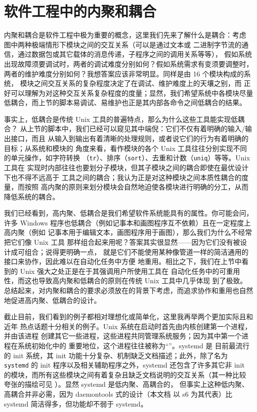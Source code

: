 \section{软件工程中的内聚和耦合}\label{sec:coupling}

内聚和耦合是软件工程中极为重要的概念，这里我们先来了解什么是耦合：考虑
\parencite{litt2014a} 图中两种极端情形下模块之间的交互关系（可以是通过文本或
二进制字节流的通信，通过数据包或其它载体的消息传递，子程序之间的调用关系等等），
假如系统出现故障须要调试时，两者的调试难度分别如何？假如系统需求有变须要调整时，
两者的维护难度分别如何？我想答案应该非常明显。同样是由 16 个模块构成的系统，
模块之间交互关系的复杂程度决定了在调试、维护难度上的天壤之别，而
正好可以理解为对这种交互关系复杂程度的度量；显然，我们希望系统中各模块尽量
低耦合，而上节的脚本易调试、易维护也正是其内部各命令之间低耦合的结果。

事实上，低耦合是传统 Unix 工具的普遍特点，那么为什么这些工具能实现低耦合？
从上节的脚本中，我们已经可以窥见其中端倪：它们不仅有着明确的输入/输出接口，而且
从输入到输出有着清晰的处理规则，或者说它们的行为有着明确的目标；从系统和模块的
角度来看，看作模块的各个 Unix 工具往往分别实现不同的单元操作，如字符转换
（\verb|tr|）、排序（\verb|sort|）、去重和计数（\verb|uniq|）等等。Unix 工具在
实现时内部往往也要划分子模块，但其子模块之间的耦合即使在最优设计下也不得不远高于
工具之间的耦合；我认为正是对这种模块之间本质性耦合的度量，而按照
高内聚的原则来划分模块会自然地迫使各模块进行明确的分工，从而降低系统的耦合。

我们已经看到，高内聚、低耦合是我们希望软件系统能具有的属性。你可能会问，许多
Windows 程序也低耦合（例如记事本和画图程序互不依赖）且在一定程度上高内聚（例如
记事本用于编辑文本，画图程序用于画图），那么我们为什么不经常把它们像 Unix 工具
那样组合起来用呢？答案其实很显然——因为它们没有被设计成可组合；说得更明确一点，
就是它们不能使用某种像管道一样的简洁通用的接口来协作，因此难以在自动化任务中方便
地重用。相比之下，我们在上节中看到的 Unix 强大之处正是在于其强调用户所使用工具在
自动化任务中的可重用性，而这也导致高内聚和低耦合的原则在传统 Unix 工具中几乎体现
到了极致。总结起来，对内聚和耦合的要求必须放在的背景下考虑，而追求协作和重用也自然地促进高内聚、低耦合的设计。

截止目前，我们看到的例子都相对理想化或简单化，这里我再举两个更加实际且和近年
热点话题十分相关的例子。Unix 系统在启动时首先由内核创建第一个进程，并由该进程
创建其它一些进程，这些进程共同管理系统服务；因为其中第一个进程在系统初始化中的
重要地位，这个进程往往被称为“”。systemd 是
目前最流行的 init 系统，其 init 功能十分复杂、机制缺乏文档描述；此外，除了名为
\verb|systemd| 的 init 程序以及相关辅助程序之外，systemd 还包含了许多其它非
init 的模块，而所有这些模块之间有着复杂且缺乏文档说明的交互关系（其一种比较
夸张的描绘可见 \parencite{litt2014b}）。显然 systemd 是低内聚、高耦合的，
但事实上这种低内聚、高耦合并非必需，因为 daemontools 式的设计（本文档
以 s6 为其代表）比 systemd 简洁得多，但功能却不弱于 systemd。

